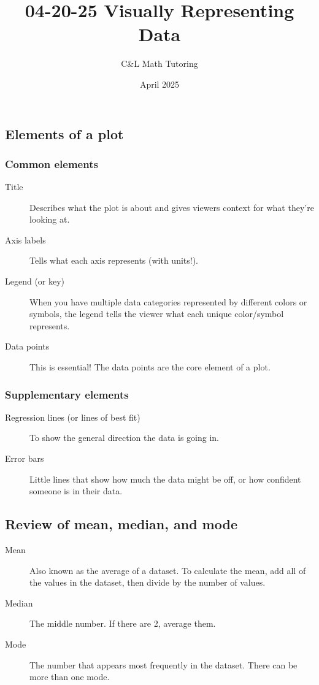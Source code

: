 \documentclass[a4paper, 12pt]{article}
\title{04-20-25 Visually Representing Data}
\author{C\&L Math Tutoring}
\date{April 2025}
\begin{document}
\maketitle

\subsection*{Elements of a plot}

\subsubsection*{Common elements}

\begin{description}
\item [Title] Describes what the plot is about and gives viewers context for what they're looking at.
\item [Axis labels] Tells what each axis represents (with units!).
\item [Legend (or key)] When you have multiple data categories represented by different colors or symbols, the legend tells the viewer what each unique color/symbol represents.
\item [Data points] This is essential! The data points are the core element of a plot.
\end{description}

\subsubsection*{Supplementary elements}

\begin{description}
\item [Regression lines (or lines of best fit)] To show the general direction the data is going in.
\item [Error bars] Little lines that show how much the data might be off, or how confident someone is in their data.
\end{description}

\subsection*{Review of mean, median, and mode}

\begin{description}
\item [Mean] Also known as the average of a dataset. To calculate the mean, add all of the values in the dataset, then divide by the number of values.
\item [Median] The middle number. If there are 2, average them.
\item [Mode] The number that appears most frequently in the dataset. There can be more than one mode.
\end{description}
\end{document}
